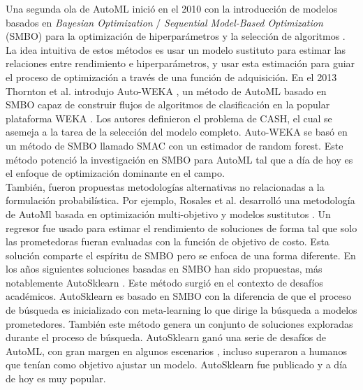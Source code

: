 Una segunda ola de AutoML inició en el 2010 con la introducción de modelos basados en \textit{Bayesian Optimization} / \textit{Sequential Model-Based Optimization} (SMBO) para la optimización de hiperparámetros y la selección de algoritmos \parencite{8} \parencite{3}. La idea intuitiva de estos métodos es usar un modelo sustituto para estimar las relaciones entre rendimiento e hiperparámetros, y usar esta estimación para guiar el proceso de optimización a través de una función de adquisición. En el 2013 Thornton et al. introdujo Auto-WEKA \parencite{13}, un método de AutoML basado en SMBO capaz de construir flujos de algoritmos de clasificación en la popular plataforma WEKA \parencite{4}. Los autores definieron el problema de CASH, el cual se asemeja a la tarea de la selección del modelo completo. Auto-WEKA se basó en un método de SMBO llamado SMAC \parencite{3} con un estimador de random forest. Este método potenció la investigación en SMBO para AutoML tal que a día de hoy es el enfoque de optimización dominante en el campo. \\

También, fueron propuestas metodologías alternativas no relacionadas a la formulación probabilística. Por ejemplo, Rosales et al. desarrolló una metodología de AutoMl basada en optimización multi-objetivo y modelos sustitutos \parencite{5}. Un regresor fue usado para estimar el rendimiento de soluciones de forma tal que solo las prometedoras fueran evaluadas con la función de objetivo de costo. Esta solución comparte el espíritu de SMBO pero se enfoca de una forma diferente. En los años siguientes soluciones basadas en SMBO han sido propuestas, más notablemente AutoSklearn \parencite{6}. Este método surgió en el contexto de desafíos académicos. AutoSklearn es basado en SMBO con la diferencia de que el proceso de búsqueda es inicializado con meta-learning lo que dirige la búsqueda a modelos prometedores. También este método genera un conjunto de soluciones exploradas durante el proceso de búsqueda. AutoSklearn ganó una serie de desafíos de AutoML, con gran margen en algunos escenarios \parencite{7}, incluso superaron a humanos que tenían como objetivo ajustar un modelo. AutoSklearn fue publicado y a día de hoy es muy popular. \\

